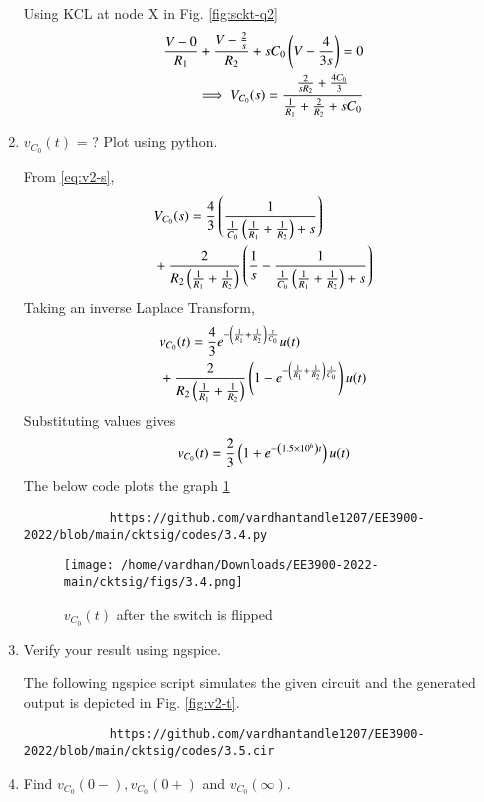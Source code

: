 \documentclass[journal,12pt,twocolumn]{IEEEtran}
\renewcommand\thesection{\arabic{section}}
\begin{document}
\begin{enumerate}[label=\arabic*.,ref=\thesection.\theenumi]
		\solution Using KCL at node X in Fig. \ref{fig:sckt-q2}
		\begin{align}
			\frac{V - 0}{R_1} + \frac{V - \frac{2}{s}}{R_2} + sC_0\left(V - \frac{4}{3s}\right) = 0 \\
			\implies V_{C_0}(s) = \frac{\frac{2}{sR_2} + \frac{4C_0}{3}}{\frac{1}{R_1} + \frac{2}{R_2} + sC_0}
			\label{eq:v2-s}
		\end{align}
		\item $v_{C_0}(t)$ = ? Plot using python.
		
		\solution From \eqref{eq:v2-s},
		\begin{align}
			&V_{C_0}(s) = \frac{4}{3}\left(\frac{1}{\frac{1}{C_0}\left(\frac{1}{R_1} + \frac{1}{R_2}\right)+s}\right) \nonumber \\
			&+ \frac{2}{R_2\left(\frac{1}{R_1} +\frac{1}{R_2}\right)}\left(\frac{1}{s} - \frac{1}{\frac{1}{C_0}\left(\frac{1}{R_1} + \frac{1}{R_2}\right) + s}\right)
		\end{align}
		Taking an inverse Laplace Transform,
		\begin{align}
			&v_{C_0}(t) = \frac{4}{3}e^{-\left(\frac{1}{R_1} + \frac{1}{R_2}\right)\frac{t}{C_0}}u(t) \nonumber \\ 
			&+ \frac{2}{R_2\left(\frac{1}{R_1}+\frac{1}{R_2}\right)}\left(1 - e^{-\left(\frac{1}{R_1} + \frac{1}{R_2}\right)\frac{t}{C_0}}\right)u(t)
		\end{align}
		Substituting values gives
		\begin{align}
			v_{C_0}(t) = \frac{2}{3}\left(1 +e^{-\left(1.5 \times 10^6\right)t}\right)u(t)
			\label{eq:v2-t}
		\end{align}
		The below code plots the graph \ref{fig:v2-t}
		\begin{lstlisting}
			https://github.com/vardhantandle1207/EE3900-2022/blob/main/cktsig/codes/3.4.py
		\end{lstlisting}
		\begin{figure}[!htb]
			\texttt{[image: /home/vardhan/Downloads/EE3900-2022-main/cktsig/figs/3.4.png]}
			\caption{$v_{C_0}(t)$ after the switch is flipped}
			\label{fig:v2-t}
		\end{figure}
		\item Verify your result using ngspice.
		
		\solution The following ngspice script simulates the given circuit and the generated output is depicted in Fig. \eqref{fig:v2-t}.
		\begin{lstlisting}
			https://github.com/vardhantandle1207/EE3900-2022/blob/main/cktsig/codes/3.5.cir
		\end{lstlisting}
		\item Find $v_{C_0}(0-), v_{C_0}(0+)$ and  $v_{C_0}(\infty) $. 
		

\end{enumerate}
\end{document}
